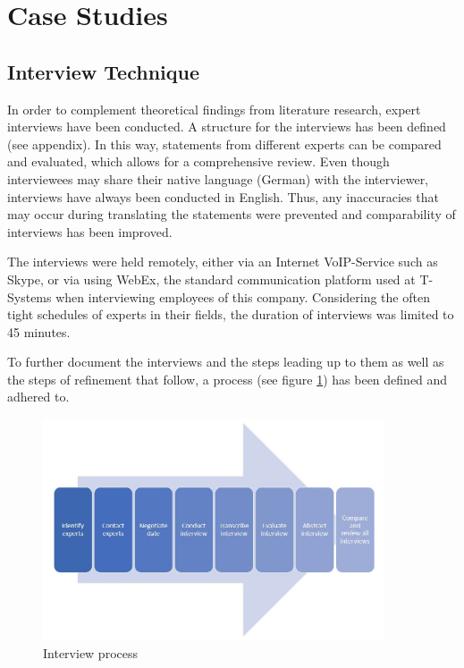 
\section{Case Studies}

\subsection{Interview Technique}
In order to complement theoretical findings from literature research, expert interviews have been conducted. A structure for the interviews has been defined (see appendix). In this way, statements from different experts can be compared and evaluated, which allows for a comprehensive review. Even though interviewees may share their native language (German) with the interviewer, interviews have always been conducted in English. Thus, any inaccuracies that may occur during translating the statements were prevented and comparability of interviews has been improved.

The interviews were held remotely, either via an Internet VoIP-Service such as Skype, or via using WebEx, the standard communication platform used at T-Systems when interviewing employees of this company. Considering the often tight schedules of experts in their fields, the duration of interviews was limited to 45 minutes.

To further document the interviews and the steps leading up to them as well as the steps of refinement that follow, a process (see figure \ref{fig:Intprocess}) has been defined and adhered to. 

\vspace{3mm}
\begin{figure}[htb]
	\centering
	\includegraphics[width=0.9\textwidth]{Pictures/Interview_process}
	\caption{Interview process}
	\label{fig:Intprocess}
\end{figure}

